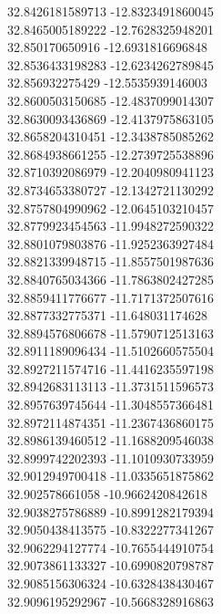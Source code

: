 {32.8426181589713	-12.8323491860045\\
32.8465005189222	-12.7628325948201\\
32.850170650916	-12.6931816696848\\
32.8536433198283	-12.6234262789845\\
32.856932275429	-12.5535939146003\\
32.8600503150685	-12.4837099014307\\
32.8630093436869	-12.4137975863105\\
32.8658204310451	-12.3438785085262\\
32.8684938661255	-12.2739725538896\\
32.8710392086979	-12.2040980941123\\
32.8734653380727	-12.1342721130292\\
32.8757804990962	-12.0645103210457\\
32.8779923454563	-11.9948272590322\\
32.8801079803876	-11.9252363927484\\
32.8821339948715	-11.8557501987636\\
32.8840765034366	-11.7863802427285\\
32.8859411776677	-11.7171372507616\\
32.8877332775371	-11.648031174628\\
32.8894576806678	-11.5790712513163\\
32.8911189096434	-11.5102660575504\\
32.8927211574716	-11.4416235597198\\
32.8942683113113	-11.3731511596573\\
32.8957639745644	-11.3048557366481\\
32.8972114874351	-11.2367436860175\\
32.8986139460512	-11.1688209546038\\
32.8999742202393	-11.1010930733959\\
32.9012949700418	-11.0335651875862\\
32.902578661058	-10.9662420842618\\
32.9038275786889	-10.8991282179394\\
32.9050438413575	-10.8322277341267\\
32.9062294127774	-10.7655444910754\\
32.9073861133327	-10.6990820798787\\
32.9085156306324	-10.6328438430467\\
32.9096195292967	-10.5668328916863\\
}
